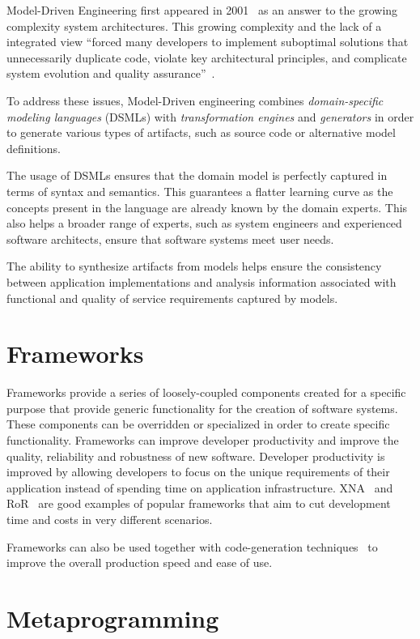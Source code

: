 Model-Driven Engineering first appeared in 2001~\cite{Mil03} as an answer to the growing complexity system architectures. This growing complexity and the lack of a integrated view ``forced many developers to implement suboptimal solutions that unnecessarily duplicate code, violate key architectural principles, and complicate system evolution and quality assurance''~\cite{Sch06}.

To address these issues, Model-Driven engineering combines \emph{domain-specific modeling languages} (DSMLs) with \emph{transformation engines} and \emph{generators} in order to generate various types of artifacts, such as source code or alternative model definitions.

The usage of DSMLs ensures that the domain model is perfectly captured in terms of syntax and semantics. This guarantees a flatter learning curve as the concepts present in the language are already known by the domain experts. This also helps a broader range of experts, such as system engineers and experienced software architects, ensure that software systems meet user needs.

The ability to synthesize artifacts from models helps ensure the consistency between application implementations and analysis information associated with functional and quality of service requirements captured by models.

\section{Frameworks}\label{sec:frameworks}

Frameworks provide a series of loosely-coupled components created for a specific purpose that provide generic functionality for the creation of software systems. These components can be overridden or specialized in order to create specific functionality. Frameworks can improve developer productivity and improve the quality, reliability and robustness of new software.  Developer productivity is improved by allowing developers to focus on the unique requirements of their application instead of spending time on application infrastructure. XNA~\cite{xna} and RoR~\cite{rubyonrails} are good examples of popular frameworks that aim to cut development time and costs in very different scenarios.

Frameworks can also be used together with code-generation techniques~\cite{DH04, rails_generators} to improve the overall production speed and ease of use.

\section{Metaprogramming}\label{sec:metaprogramming}

